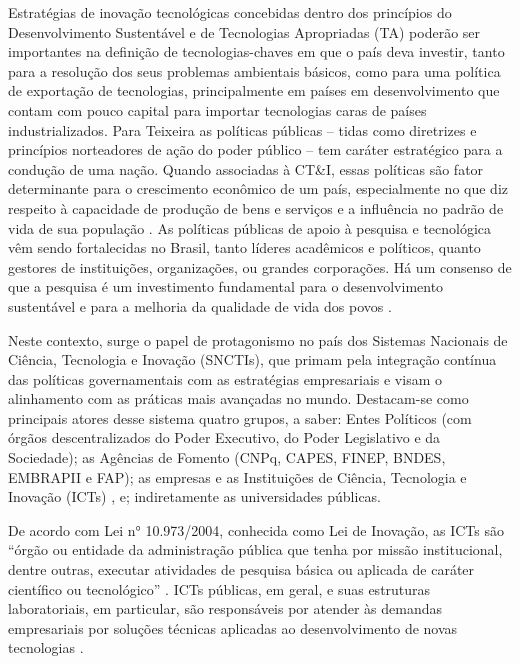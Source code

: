 Estratégias de inovação tecnológicas concebidas dentro dos princípios do Desenvolvimento Sustentável e de Tecnologias Apropriadas (TA) poderão ser importantes na definição de tecnologias-chaves em que o país deva investir, tanto para a resolução dos seus problemas ambientais básicos, como para uma política de exportação de tecnologias, principalmente em países em desenvolvimento que contam com pouco capital para importar tecnologias caras de países industrializados. Para Teixeira  as políticas públicas – tidas como diretrizes e princípios norteadores de ação do poder público – tem caráter estratégico para a condução de uma nação. Quando associadas à CT\&I, essas políticas são fator determinante para o crescimento econômico de um país, especialmente no que diz respeito à capacidade de produção de bens e serviços e a influência no padrão de vida de sua população .
As políticas públicas de apoio à pesquisa e tecnológica vêm sendo fortalecidas no Brasil, tanto líderes acadêmicos e políticos, quanto gestores de instituições, organizações, ou grandes corporações.  Há um consenso de que a pesquisa é um investimento fundamental para o desenvolvimento sustentável e para a melhoria da qualidade de vida dos povos \cite{bufrem_politicas_2018}.

Neste contexto, surge o papel de protagonismo no país dos Sistemas Nacionais de Ciência, Tecnologia e Inovação (SNCTIs), que primam pela integração contínua das políticas governamentais com as estratégias empresariais e visam o alinhamento com as práticas mais avançadas no mundo. Destacam-se como principais atores desse sistema quatro grupos, a saber: Entes Políticos (com órgãos descentralizados do Poder Executivo, do Poder Legislativo e da Sociedade); as Agências de Fomento (CNPq, CAPES, FINEP, BNDES, EMBRAPII e FAP); as empresas e as Instituições de Ciência, Tecnologia e Inovação (ICTs) \cite{mcti_estrategia_2016}, e; indiretamente as universidades públicas.

De acordo com Lei n° 10.973/2004, conhecida como Lei de Inovação, as ICTs são “órgão ou entidade da administração pública que tenha por missão institucional, dentre outras, executar atividades de pesquisa básica ou aplicada de caráter científico ou tecnológico” \cite{brazil_l1097304_2004}. ICTs públicas, em geral, e suas estruturas laboratoriais, em particular, são responsáveis por atender às demandas empresariais por soluções técnicas aplicadas ao desenvolvimento de novas tecnologias \cite{turchi_politicas_2017}.

